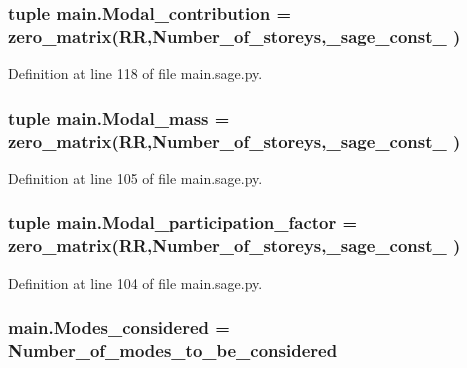 \subsubsection[{Modal\+\_\+contribution}]{\setlength{\rightskip}{0pt plus 5cm}tuple main.\+Modal\+\_\+contribution = zero\+\_\+matrix(R\+R,Number\+\_\+of\+\_\+storeys,\+\_\+sage\+\_\+const\+\_ )}\label{namespacemain_ab273c2ae46514d6ec3d905c30cbb5a1b}


Definition at line 118 of file main.\+sage.\+py.

\hypertarget{namespacemain_a176940b2d446033050ac092436f63974}{}
\subsubsection[{Modal\+\_\+mass}]{\setlength{\rightskip}{0pt plus 5cm}tuple main.\+Modal\+\_\+mass = zero\+\_\+matrix(R\+R,Number\+\_\+of\+\_\+storeys,\+\_\+sage\+\_\+const\+\_ )}\label{namespacemain_a176940b2d446033050ac092436f63974}


Definition at line 105 of file main.\+sage.\+py.

\hypertarget{namespacemain_a936ce857e8e4f4855af1cc5bf2635191}{}
\subsubsection[{Modal\+\_\+participation\+\_\+factor}]{\setlength{\rightskip}{0pt plus 5cm}tuple main.\+Modal\+\_\+participation\+\_\+factor = zero\+\_\+matrix(R\+R,Number\+\_\+of\+\_\+storeys,\+\_\+sage\+\_\+const\+\_ )}\label{namespacemain_a936ce857e8e4f4855af1cc5bf2635191}


Definition at line 104 of file main.\+sage.\+py.

\hypertarget{namespacemain_a9d22ac077c22a97b1b095068a1500d16}{}
\subsubsection[{Modes\+\_\+considered}]{\setlength{\rightskip}{0pt plus 5cm}main.\+Modes\+\_\+considered = Number\+\_\+of\+\_\+modes\+\_\+to\+\_\+be\+\_\+considered}\label{namespacemain_a9d22ac077c22a97b1b095068a1500d16}


